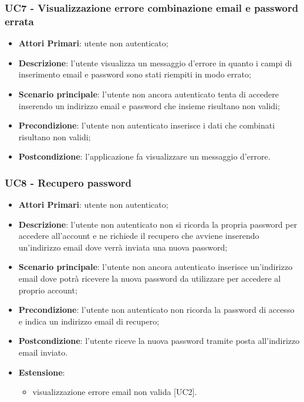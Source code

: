 \subsubsection{UC7 - Visualizzazione errore combinazione email e password errata}
\begin{itemize}
	\item \textbf{Attori Primari}: utente non autenticato;
	\item \textbf{Descrizione}: l'utente visualizza un messaggio d'errore in quanto i campi di inserimento email e password sono stati riempiti in modo errato;
	\item \textbf{Scenario principale}: l'utente non ancora autenticato tenta di accedere inserendo un indirizzo email e password che insieme risultano non validi;	
	\item \textbf{Precondizione}: l'utente non autenticato inserisce i dati che combinati risultano non validi;
	\item \textbf{Postcondizione}: l'applicazione fa visualizzare un messaggio d'errore.
\end{itemize}
\subsubsection{UC8 - Recupero password}
\begin{itemize}
	\item \textbf{Attori Primari}: utente non autenticato;
	\item \textbf{Descrizione}: l'utente non autenticato non si ricorda la propria password per accedere all'account e ne richiede il recupero che avviene inserendo un'indirizzo email dove verrà inviata una nuova password;
	\item \textbf{Scenario principale}: l'utente non ancora autenticato inserisce un'indirizzo email dove potrà ricevere la nuova password da utilizzare per accedere al proprio account; 
	\item \textbf{Precondizione}: l'utente non autenticato non ricorda la password di accesso e indica un indirizzo email di recupero;
	\item \textbf{Postcondizione}: l'utente riceve la nuova password tramite posta all'indirizzo email inviato.
	\item \textbf{Estensione}:
		\begin{itemize}
			\item visualizzazione errore email non valida [UC2].
		\end{itemize}
\end{itemize}

